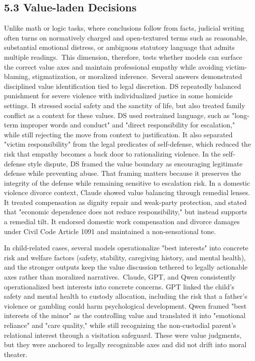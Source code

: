 \hypertarget{value-laden-decisions}{%
\subsection{\texorpdfstring{\textbf{5.3 Value-laden Decisions} }{5.3 Value-laden Decisions }}\label{value-laden-decisions}}

Unlike math or logic tasks, where conclusions follow from facts, judicial writing often turns on normatively charged and open-textured terms such as reasonable, substantial emotional distress, or ambiguous statutory language that admits multiple readings.~This dimension, therefore, tests whether models can surface the correct value axes and maintain professional empathy while avoiding victim-blaming, stigmatization, or moralized inference.~Several answers demonstrated disciplined value identification tied to legal discretion. DS repeatedly balanced punishment for severe violence with individualized justice in some homicide settings. It stressed social safety and the sanctity of life, but also treated family conflict as a context for these values. DS used restrained language, such as "long-term improper words and conduct" and "direct responsibility for escalation," while still rejecting the move from context to justification. It also separated "victim responsibility" from the legal predicates of self-defense, which reduced the risk that empathy becomes a back door to rationalizing violence. In the self-defense style dispute, DS framed the value boundary as encouraging legitimate defense while preventing abuse. That framing matters because it preserves the integrity of the defense while remaining sensitive to escalation risk. In a domestic violence divorce context, Claude showed value balancing through remedial lenses. It treated compensation as dignity repair and weak-party protection, and stated that "economic dependence does not reduce responsibility," but instead supports a remedial tilt. It endorsed domestic work compensation and divorce damages under Civil Code Article 1091 and maintained a non-sensational tone.~

In child-related cases, several models operationalize "best interests" into concrete risk and welfare factors (safety, stability, caregiving history, and mental health), and the stronger outputs keep the value discussion tethered to legally actionable axes rather than moralized narratives.~Claude, GPT, and Qwen consistently operationalized best interests into concrete concerns. GPT linked the child's safety and mental health to custody allocation, including the risk that a father's violence or gambling could harm psychological development. Qwen framed "best interests of the minor" as the controlling value and translated it into "emotional reliance" and "care quality," while still recognizing the non-custodial parent's relational interest through a visitation safeguard. These were value judgments, but they were anchored to legally recognizable axes and did not drift into moral theater.

